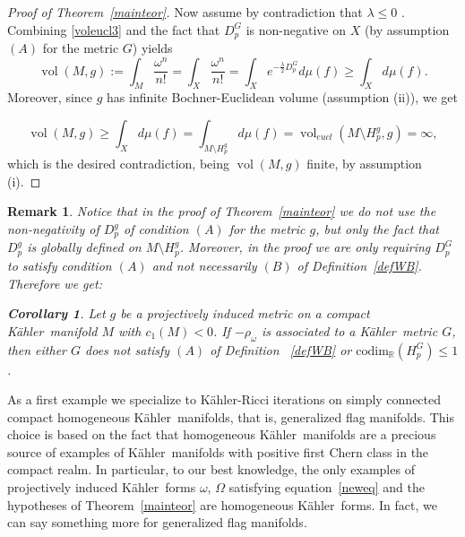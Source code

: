 \documentclass[12pt]{amsart}
\newcommand{\R}{\mathbb{R}}
\newcommand{\codim}{\mathrm{codim}}
\newcommand{\K}{K\"{a}hler}
\newcommand{\vol}{{\operatorname{vol}}}
\newtheorem{cor}{Corollary}
\newtheorem{remark}{Remark}
\begin{document}
\begin{proof}[Proof of Theorem~\ref{mainteor}]
Now assume by contradiction that $\lambda\leq 0$ .
Combining
\eqref{voleucl3} and the fact that $D^G_{p}$ is non-negative on $X$
(by assumption $(A)$ for the metric $G$) 
yields
$$\vol (M, g):=\int_M\frac{\omega^n}{n!}=\int_X\frac{\omega^n}{n!}=\int_Xe^{-\frac{\lambda}{2}D^G_p}
d\mu (f)\geq\int_X d\mu (f).$$
Moreover, since $g$ has infinite Bochner-Euclidean volume (assumption (ii)), we get

$$\vol (M, g)\geq\int_X d\mu (f)=\int_{M\setminus H_p^g} d\mu (f)=\vol_{eucl} (M\setminus H_p^g, g)=\infty,$$
which is the desired contradiction,
being $\vol (M, g)$ finite,  by assumption (i).
\end{proof}


\begin{remark}\rm\label{rmkafterth}
Notice that in the proof of Theorem~\ref{mainteor} we do not use the non-negativity of $D_p^g$  of condition 
$(A)$ for the  metric $g$,
but only the fact that $D^g_p$ is globally defined on $M\setminus H_p^g$. 
Moreover, in the proof  we are  only requiring $D^G_p$ to satisfy condition $(A)$ and not necessarily $(B)$ of  Definition~\ref{defWB}.
Therefore we get:
\begin{cor}\label{CorConditionsProjInduced}
	Let $g$ be a projectively induced metric on a compact \K\ manifold $M$ with $c_1(M)<0$. If $-\rho_\omega$ is associated to a \K\ metric $G$, then either $G$ does not satisfy $(A)$ of Definition 
	~\ref{defWB}  or 
	$\codim_{\R}(H_p^G)\leq 1$.
\end{cor}
\end{remark}
As a first example we specialize to \K-Ricci iterations on simply connected compact homogeneous \K\ manifolds, that is, generalized flag manifolds.
This choice is based on the fact that homogeneous \K\ manifolds are a precious source of examples of \K\ manifolds with positive first Chern class in the compact realm.
In particular, to our best knowledge, the only examples of projectively induced \K\ forms $\omega$, $\Omega$ satisfying equation~\eqref{neweq} and the hypotheses of Theorem~\ref{mainteor} are homogeneous \K\ forms.
In fact, we can say something more for generalized flag manifolds. 
\end{document}
